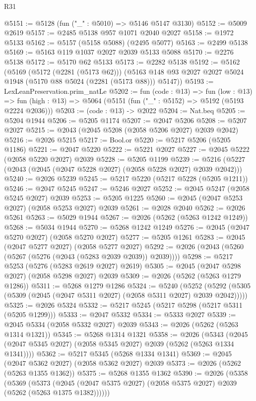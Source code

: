 \begin{lexlean}{R31}
\begin{coremodule}
@5151 := @5128 (fun ("_" : @5010) => @5146 @5147 @3130)
@5152 := @5009 @2619
@5157 := @2485 @5138 @957 @1071 @2040 @2027
@5158 := @1972 @5133
@5162 := @5157 (@5158 @5088) (@2495 @5077)
@5163 := @2499 @5138
@5169 := @5163 @119 @1037 @2027 @2039 @5133 @5088
@5170 := @2276 @5138
@5172 := @5170 @62 @5133
@5173 := @2282 @5138
@5192 := @5162
    (@5169
      (@5172 (@2281 (@5173 @62)))
      (@5163 @148 @93 @2027 @2027 @5024 @1948 (@5170 @88 @5024 (@2281 (@5173 @88))) @5147))
@5193 := LexLeanPreservation.prim_natLe
@5202 := fun (code : @13) =>
  fun (low : @13) =>
  fun (high : @13) => @5064 (@5151 (fun ("_" : @5152) => @5192 (@5193 @2224 @2036)))
@5203 := (code : @13) -> @2022
@5204 := Nat.beq
@5205 := @5204 @1944
@5206 := @5205 @1174
@5207 := @2047 @5206
@5208 := @5207 @2027
@5215 := @2043 (@2045 @5208 (@2058 @5206 @2027) @2039 @2042)
@5216 := @2026 @5215
@5217 := Bool.or
@5220 := @5217 @5206 (@5205 @1186)
@5221 := @2047 @5220
@5222 := @5221 @2027
@5227 := @2045 @5222 (@2058 @5220 @2027) @2039
@5228 := @5205 @1199
@5239 := @5216 (@5227 (@2043 (@2045 (@2047 @5228 @2027) (@2058 @5228 @2027) @2039 @2042)))
@5240 := @2026 @5239
@5245 := @5217 @5220 (@5217 @5228 (@5205 @1211))
@5246 := @2047 @5245
@5247 := @5246 @2027
@5252 := @2045 @5247 (@2058 @5245 @2027) @2039
@5253 := @5205 @1225
@5260 := @2045 (@2047 @5253 @2027) (@2058 @5253 @2027) @2039
@5261 := @2028 @2040
@5262 := @2026 @5261
@5263 := @5029 @1944
@5267 := @2026 (@5262 (@5263 @1242 @1249))
@5268 := @5034 @1944
@5270 := @5268 @1242 @1249
@5276 := @2045 (@2047 @5270 @2027) (@2058 @5270 @2027)
@5277 := @5205 @1261
@5283 := @2045 (@2047 @5277 @2027) (@2058 @5277 @2027)
@5292 := @2026 (@2043 (@5260 (@5267 (@5276 (@2043 (@5283 @2039 @2039)) @2039))))
@5298 := @5217 @5253 (@5276 (@5283 @2619 @2027) @2619)
@5305 := @2045 (@2047 @5298 @2027) (@2058 @5298 @2027) @2039
@5309 := @2026 (@5262 (@5263 @1279 @1286))
@5311 := @5268 @1279 @1286
@5324 := @5240
    (@5252 (@5292 (@5305 (@5309 (@2045 (@2047 @5311 @2027) (@2058 @5311 @2027) @2039 @2042)))))
@5325 := @2026 @5324
@5332 := @5217 @5245 (@5217 @5298 (@5217 @5311 (@5205 @1299)))
@5333 := @2047 @5332
@5334 := @5333 @2027
@5339 := @2045 @5334 (@2058 @5332 @2027) @2039
@5343 := @2026 (@5262 (@5263 @1314 @1321))
@5345 := @5268 @1314 @1321
@5358 := @2026
    (@5343 (@2045 (@2047 @5345 @2027) (@2058 @5345 @2027) @2039 (@5262 (@5263 @1334 @1341))))
@5362 := @5217 @5345 (@5268 @1334 @1341)
@5369 := @2045 (@2047 @5362 @2027) (@2058 @5362 @2027) @2039
@5373 := @2026 (@5262 (@5263 @1355 @1362))
@5375 := @5268 @1355 @1362
@5390 := @2026
    (@5358
      (@5369
        (@5373 (@2045 (@2047 @5375 @2027) (@2058 @5375 @2027) @2039 (@5262 (@5263 @1375 @1382))))))

\end{coremodule}
\end{lexlean}
